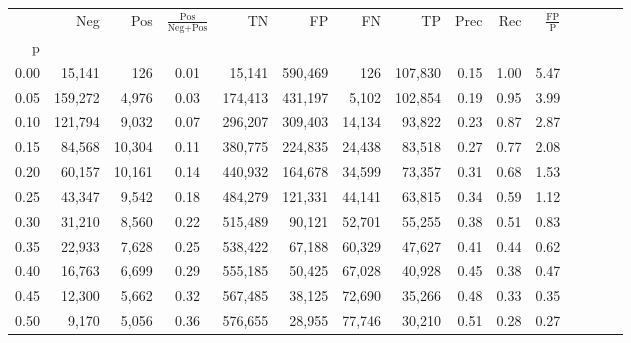 \begin{tabular}{rrrcrrrrrrrrrrr}
\toprule
{} &      Neg &     Pos & $\frac{\text{Pos}}{\text{Neg}+\text{Pos}}$ &       TN &       FP &       FN &       TP &  Prec &   Rec & $\frac{\text{FP}}{\text{P}}$ \\
p    &          &         &                                            &          &          &          &          &       &       &                              \\
\midrule
0.00 &   15,141 &     126 &                                       0.01 &   15,141 &  590,469 &      126 &  107,830 &  0.15 &  1.00 &                         5.47 \\
0.05 &  159,272 &   4,976 &                                       0.03 &  174,413 &  431,197 &    5,102 &  102,854 &  0.19 &  0.95 &                         3.99 \\
0.10 &  121,794 &   9,032 &                                       0.07 &  296,207 &  309,403 &   14,134 &   93,822 &  0.23 &  0.87 &                         2.87 \\
0.15 &   84,568 &  10,304 &                                       0.11 &  380,775 &  224,835 &   24,438 &   83,518 &  0.27 &  0.77 &                         2.08 \\
0.20 &   60,157 &  10,161 &                                       0.14 &  440,932 &  164,678 &   34,599 &   73,357 &  0.31 &  0.68 &                         1.53 \\
0.25 &   43,347 &   9,542 &                                       0.18 &  484,279 &  121,331 &   44,141 &   63,815 &  0.34 &  0.59 &                         1.12 \\
0.30 &   31,210 &   8,560 &                                       0.22 &  515,489 &   90,121 &   52,701 &   55,255 &  0.38 &  0.51 &                         0.83 \\
0.35 &   22,933 &   7,628 &                                       0.25 &  538,422 &   67,188 &   60,329 &   47,627 &  0.41 &  0.44 &                         0.62 \\
0.40 &   16,763 &   6,699 &                                       0.29 &  555,185 &   50,425 &   67,028 &   40,928 &  0.45 &  0.38 &                         0.47 \\
0.45 &   12,300 &   5,662 &                                       0.32 &  567,485 &   38,125 &   72,690 &   35,266 &  0.48 &  0.33 &                         0.35 \\
0.50 &    9,170 &   5,056 &                                       0.36 &  576,655 &   28,955 &   77,746 &   30,210 &  0.51 &  0.28 &                         0.27 \\

\end{tabular}
